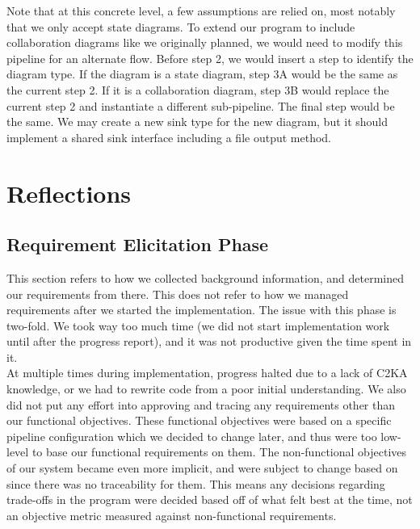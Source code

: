 \documentclass[11pt]{article}
\begin{document}
    Note that at this concrete level, a few assumptions are relied on, most notably that we only accept state diagrams.
    To extend our program to include collaboration diagrams like we originally planned,
    we would need to modify this pipeline for an alternate flow.
    Before step 2, we would insert a step to identify the diagram type.
    If the diagram is a state diagram, step 3A would be the same as the current step 2.
    If it is a collaboration diagram, step 3B would replace the current step 2 and instantiate a different sub-pipeline.
    The final step would be the same.
    We may create a new sink type for the new diagram,
    but it should implement a shared sink interface including a file output method.

    \section{Reflections}
    \subsection{Requirement Elicitation Phase}
    This section refers to how we collected background information, and determined our requirements from there.
    This does not refer to how we managed requirements after we started the implementation.
    The issue with this phase is two-fold.
    We took way too much time (we did not start implementation work until after the progress report),
    and it was not productive given the time spent in it.\\

    At multiple times during implementation, progress halted due to a lack of C2KA knowledge,
    or we had to rewrite code from a poor initial understanding.
    We also did not put any effort into approving and tracing any requirements other than our functional objectives.
    These functional objectives were based on a specific pipeline configuration which we decided to change later,
    and thus were too low-level to base our functional requirements on them.
    The non-functional objectives of our system became even more implicit, and were subject to change based on
    since there was no traceability for them.
    This means any decisions regarding trade-offs in the program were decided based off of what felt best at the time,
    not an objective metric measured against non-functional requirements.\\
\end{document}
